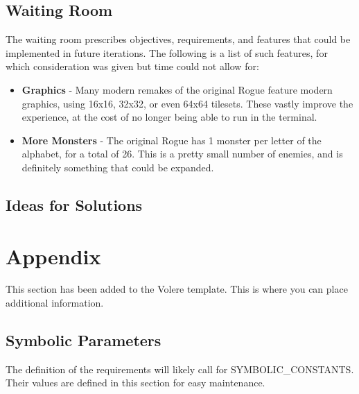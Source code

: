 \documentclass[12pt, titlepage]{article}
\begin{document}
	\subsection{Waiting Room}

	The waiting room prescribes objectives, requirements, and features that could be implemented in future iterations. The following is a list of such features, for which consideration was given but time could not allow for:
	\begin{itemize}
		\item \textbf{Graphics} - Many modern remakes of the original Rogue feature modern graphics, using 16x16, 32x32, or even 64x64 tilesets. These vastly improve the experience, at the cost of no longer being able to run in the terminal.
		\item \textbf{More Monsters} - The original Rogue has 1 monster per letter of the alphabet, for a total of 26. This is a pretty small number of enemies, and is definitely something that could be expanded.
	\end{itemize}

	\subsection{Ideas for Solutions}

\newpage





\newpage

\section{Appendix}

This section has been added to the Volere template.  This is where you can place
additional information.

	\subsection{Symbolic Parameters}

	The definition of the requirements will likely call for SYMBOLIC\_CONSTANTS.
	Their values are defined in this section for easy maintenance.
\end{document}
